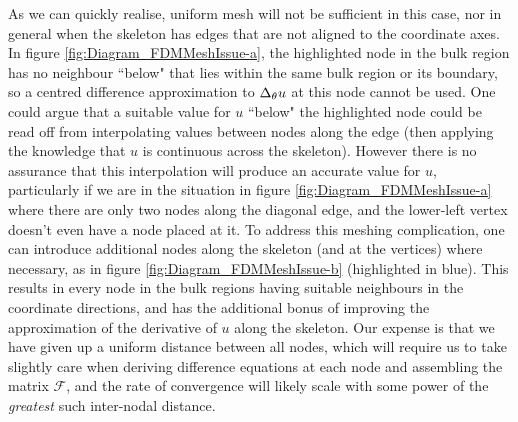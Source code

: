 As we can quickly realise, uniform mesh will not be sufficient in this case, nor in general when the skeleton has edges that are not aligned to the coordinate axes. 
In figure \ref{fig:Diagram_FDMMeshIssue-a}, the highlighted node in the bulk region has no neighbour ``below" that lies within the same bulk region or its boundary, so a centred difference approximation to $\Delta_{\theta}u$ at this node cannot be used.
One could argue that a suitable value for $u$ ``below" the highlighted node could be read off from interpolating values between nodes along the edge (then applying the knowledge that $u$ is continuous across the skeleton).
However there is no assurance that this interpolation will produce an accurate value for $u$, particularly if we are in the situation in figure \ref{fig:Diagram_FDMMeshIssue-a} where there are only two nodes along the diagonal edge, and the lower-left vertex doesn't even have a node placed at it.
To address this meshing complication, one can introduce additional nodes along the skeleton (and at the vertices) where necessary, as in figure \ref{fig:Diagram_FDMMeshIssue-b} (highlighted in blue).
This results in every node in the bulk regions having suitable neighbours in the coordinate directions, and has the additional bonus of improving the approximation of the derivative of $u$ along the skeleton.
Our expense is that we have given up a uniform distance between all nodes, which will require us to take slightly care when deriving difference equations at each node and assembling the matrix $\mathcal{F}$, and the rate of convergence will likely scale with some power of the \emph{greatest} such inter-nodal distance.

